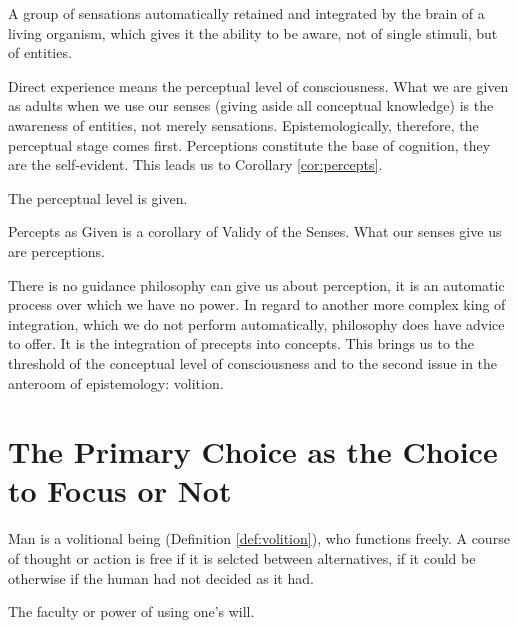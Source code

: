             \begin{definition}[Perception]
            \label{def:perception}
                A group of sensations automatically retained and integrated by the brain of a living organism, which gives it the ability to be aware, not of single stimuli, but of entities.
            \end{definition}

        Direct experience means the perceptual level of consciousness. What we are given as adults when we use our senses (giving aside all conceptual knowledge) is the awareness of entities, not merely sensations. Epistemologically, therefore, the perceptual stage comes first. Perceptions constitute the base of cognition, they are the self-evident. This leads us to Corollary \ref{cor:percepts}.

            \begin{corollary}
            \label{cor:percepts}
                The perceptual level is given.
            \end{corollary}

            \begin{remark}
                Percepts as Given is a corollary of Validy of the Senses. What our senses give us are perceptions.
            \end{remark}
    
        There is no guidance philosophy can give us about perception, it is an automatic process over which we have no power. In regard to another more complex king of integration, which we do not perform automatically, philosophy does have advice to offer. It is the integration of precepts into concepts. This brings us to the threshold of the conceptual level of consciousness and to the second issue in the anteroom of epistemology: volition.

    \section{The Primary Choice as the Choice to Focus or Not}

        Man is a volitional being (Definition \ref{def:volition}), who functions freely. A course of thought or action is free if it is selcted between alternatives, if it could be otherwise if the human had not decided as it had.

            \begin{definition}[Volition]
            \label{def:volition}
                The faculty or power of using one's will.
            \end{definition}

